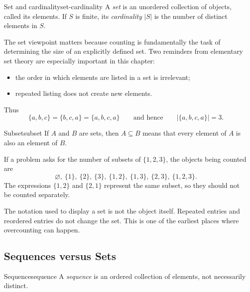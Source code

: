 \begin{definition}{Set and cardinality}{set-cardinality}
A \emph{set} is an unordered collection of objects, called its elements. If $S$ is finite, its \emph{cardinality} $|S|$ is the number of distinct elements in $S$.
\end{definition}

The set viewpoint matters because counting is fundamentally the task of determining the size of an explicitly defined set. Two reminders from elementary set theory are especially important in this chapter:
\begin{itemize}[leftmargin=*]
    \item the order in which elements are listed in a set is irrelevant;
    \item repeated listing does not create new elements.
\end{itemize}

Thus
\[
\{a,b,c\}=\{b,c,a\}=\{a,b,c,a\}
\qquad\text{and hence}\qquad
|\{a,b,c,a\}|=3.
\]

\begin{definition}{Subset}{subset}
If $A$ and $B$ are sets, then $A\subseteq B$ means that every element of $A$ is also an element of $B$.
\end{definition}

\begin{examplebox}[title={Why the notion of a set matters in counting}]
If a problem asks for the number of subsets of $\{1,2,3\}$, the objects being counted are
\[
\varnothing,\ \{1\},\ \{2\},\ \{3\},\ \{1,2\},\ \{1,3\},\ \{2,3\},\ \{1,2,3\}.
\]
The expressions $\{1,2\}$ and $\{2,1\}$ represent the same subset, so they should not be counted separately.
\end{examplebox}

\begin{commonmistake}[title={Counting symbols instead of distinct elements}]
The notation used to display a set is not the object itself. Repeated entries and reordered entries do not change the set. This is one of the earliest places where overcounting can happen.
\end{commonmistake}

\subsection{Sequences versus Sets}

\begin{definition}{Sequence}{sequence}
A \emph{sequence} is an ordered collection of elements, not necessarily distinct.
\end{definition}

